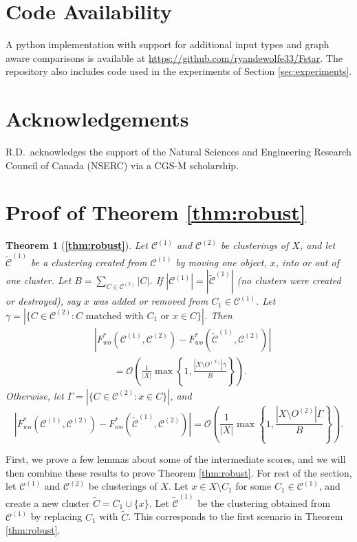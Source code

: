 \documentclass[11pt]{article}
\newtheorem*{thm*}{Theorem}
\theoremstyle{remark}
\newcommand\cCone{\mathcal{C}^{(1)}}
\newcommand\tcCone{\tilde{\mathcal{C}}^{(1)}}
\newcommand\cCtwo{\mathcal{C}^{(2)}}
\newcommand{\bigO}{\mathcal{O}}
\begin{document}
\section*{Code Availability}
A python implementation with support for additional input types and graph aware comparisons is available at \href{https://github.com/ryandewolfe33/Fstar}{https://github.com/ryandewolfe33/Fstar}.
The repository also includes code used in the experiments of Section \ref{sec:experiments}.

\section*{Acknowledgements}
R.D.~acknowledges the support of the Natural Sciences and Engineering Research Council of Canada (NSERC) via a CGS-M scholarship.




\pagebreak
\appendix
\section{Proof of Theorem \ref{thm:robust}} \label{app:proof}

\begin{thm*}[\textbf{\ref{thm:robust}}]
    Let $\cCone$ and $\cCtwo$ be clusterings of $X$, and let $\tcCone$ be a clustering created from $\cCone$ by moving one object, $x$, into or out of one cluster.
    Let $B = \sum_{C \in \cCtwo} |C|$.
    If $|\cCone| = |\tcCone|$ (no clusters were created or destroyed), say $x$ was added or removed from $C_1 \in \cCone$.
    Let $\gamma = |\{C \in \cCtwo : C \text{ matched with } C_1 \text{ or } x \in C\}|$.
    Then
    \begin{align*}
    &\left| F^*_{wo}(\cCone, \cCtwo) - F^*_{wo}(\tcCone, \cCtwo) \right|\\
    &\qquad = \bigO \left( \frac{1}{|X|} \max \left\{ 1, \frac{|X \setminus O^{(2)}| \gamma}{B} \right\} \right).
    \end{align*}
    Otherwise, let $\Gamma = |\{C \in \cCtwo : x \in C\}|$, and
    \begin{equation*}
            \left| F^*_{wo}(\cCone, \cCtwo) - F^*_{wo}(\tcCone, \cCtwo) \right| = \bigO \left( \frac{1}{|X|} \max \left\{ 1, \frac{|X \setminus O^{(2)}| \Gamma}{B} \right\} \right).
    \end{equation*}
\end{thm*}

First, we prove a few lemmas about some of the intermediate scores, and we will then combine these results to prove Theorem \ref{thm:robust}.
For rest of the section, let $\cCone$ and $\cCtwo$ be clusterings of $X$. 
Let $x \in X \setminus C_1$ for some $C_1 \in \cCone$, and create a new cluster $\tilde{C} = C_1 \cup \{x\}$.
Let $\tcCone$ be the clustering obtained from $\cCone$ by replacing $C_1$ with $\tilde{C}$.
This corresponds to the first scenario in Theorem \ref{thm:robust}.
\end{document}
